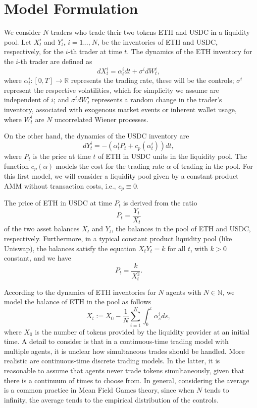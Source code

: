 \documentclass[11pt]{article}
\theoremstyle{definition}
\begin{document}
\section{Model Formulation}
\label{sec:Model Formulation}
We consider $N$ traders who trade their two tokens ETH and USDC in a liquidity pool. Let $X_t^i$ and $Y_t^i$, $i=1\dots,N$, be the inventories of ETH and USDC, respectively, for the $i$-th trader at time $t$. The dynamics of the ETH inventory for the $i$-th trader are defined as
\begin{equation}\label{dynamics of X}
  dX_t^i = \alpha_t^i dt + \sigma^i dW_t^i,  
\end{equation}
where $\alpha_t^i : [0,T] \to \mathbb{R}$ represents the trading rate, these will be the controls; $\sigma^i$ represent the respective volatilities, which for simplicity we assume are independent of $i$; and $\sigma^i dW_t^i$ represents a random change in the trader's inventory, associated with exogenous market events or inherent wallet usage, where $W_t^i$ are $N$ uncorrelated Wiener processes.

On the other hand, the dynamics of the USDC inventory are
$$ dY_t^i = -(\alpha_t^i P_t + c_p(\alpha_t^i)) dt, $$
where $P_t$ is the price at time $t$ of ETH in USDC units in the liquidity pool. The function $c_p(\alpha)$ models the cost for the trading rate $\alpha$ of trading in the pool. For this first model, we will consider a liquidity pool given by a constant product AMM without transaction costs, i.e., $c_p \equiv 0$. 

The price of ETH in USDC at time $P_t$ is derived from the ratio 
$$ P_t = \frac{Y_t}{X_t} $$
of the two asset balances $X_t$ and $Y_t$, the balances in the pool of ETH and USDC, respectively. Furthermore, in a typical constant product liquidity pool (like Uniswap), the balances satisfy the equation $X_t Y_t = k$ for all $t$, with $k>0$ constant, and we have
$$ P_t = \frac{k}{X_t^2}. $$

According to the dynamics of ETH inventories for $N$ agents with $N \in \mathbb{N}$, we model the balance of ETH in the pool as follows
$$ X_t := X_0 - \frac{1}{N} \sum_{i=1}^N \int_0^t \alpha_s^i ds, $$
where $X_0$ is the number of tokens provided by the liquidity provider at an initial time.
A detail to consider is that in a continuous-time trading model with multiple agents, it is unclear how simultaneous trades should be handled. More realistic are continuous-time discrete trading models. In the latter, it is reasonable to assume that agents never trade tokens simultaneously, given that there is a continuum of times to choose from. In general, considering the average is a common practice in Mean Field Games theory, since when $N$ tends to infinity, the average tends to the empirical distribution of the controls. 
\end{document}
